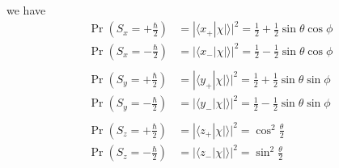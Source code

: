we have
\begin{align*}
\Pr\left(S_x=+\tfrac{\hbar}{2}\right)
&=|\langle x_+|\chi|\rangle|^2=\tfrac{1}{2}+\tfrac{1}{2}\sin\theta\cos\phi
\\
\Pr\left(S_x=-\tfrac{\hbar}{2}\right)
&=|\langle x_-|\chi|\rangle|^2=\tfrac{1}{2}-\tfrac{1}{2}\sin\theta\cos\phi
\\
\\
\Pr\left(S_y=+\tfrac{\hbar}{2}\right)
&=|\langle y_+|\chi|\rangle|^2=\tfrac{1}{2}+\tfrac{1}{2}\sin\theta\sin\phi
\\
\Pr\left(S_y=-\tfrac{\hbar}{2}\right)
&=|\langle y_-|\chi|\rangle|^2=\tfrac{1}{2}-\tfrac{1}{2}\sin\theta\sin\phi
\\
\\
\Pr\left(S_z=+\tfrac{\hbar}{2}\right)
&=|\langle z_+|\chi|\rangle|^2=\cos^2\tfrac{\theta}{2}
\\
\Pr\left(S_z=-\tfrac{\hbar}{2}\right)
&=|\langle z_-|\chi|\rangle|^2=\sin^2\tfrac{\theta}{2}
\end{align*}


